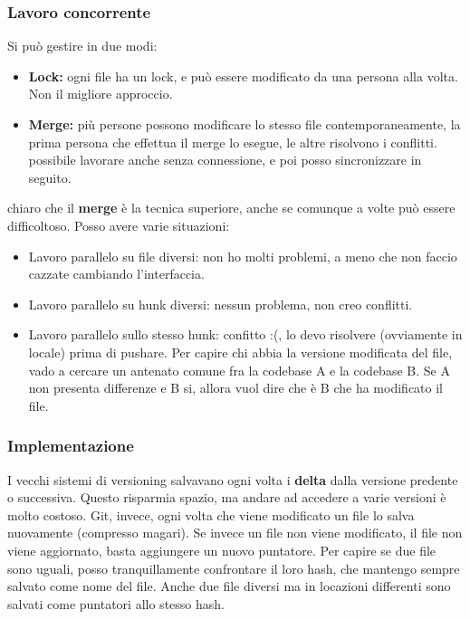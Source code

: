 \documentclass[a4paper,12pt]{article}
\begin{document}
\subsubsection{Lavoro concorrente}
Si può gestire in due modi:
\begin{itemize}
\item \textbf{Lock:} ogni file ha un lock, e può essere modificato da una persona alla volta. Non il migliore approccio.
\item \textbf{Merge:} più persone possono modificare lo stesso file contemporaneamente, la prima persona che effettua il merge lo esegue, le altre risolvono i conflitti. \E possibile lavorare anche senza connessione, e poi posso sincronizzare in seguito.
\end{itemize}
\E chiaro che il \textbf{merge} è la tecnica superiore, anche se comunque a volte può essere difficoltoso. Posso avere varie situazioni:
\begin{itemize}
\item Lavoro parallelo su file diversi: non ho molti problemi, a meno che non faccio cazzate cambiando l'interfaccia.
\item Lavoro parallelo su hunk diversi: nessun problema, non creo conflitti.
\item Lavoro parallelo sullo stesso hunk: confitto :(, lo devo risolvere (ovviamente in locale) prima di pushare. Per capire chi abbia la versione modificata del file, vado a cercare un antenato comune fra la codebase A e la codebase B. Se A non presenta differenze e B si, allora vuol dire che è B che ha modificato il file.
\end{itemize}


\subsubsection{Implementazione}
I vecchi sistemi di versioning salvavano ogni volta i \textbf{delta} dalla versione predente o successiva. Questo risparmia spazio, ma andare ad accedere a varie versioni è molto costoso. Git, invece, ogni volta che viene modificato un file lo salva nuovamente (compresso magari). Se invece un file non viene modificato, il file non viene aggiornato, basta aggiungere un nuovo puntatore.  Per capire se due file sono uguali, posso tranquillamente confrontare il loro hash, che mantengo sempre salvato come nome del file. Anche due file diversi ma in locazioni differenti sono salvati come puntatori allo stesso hash.
\end{document}
